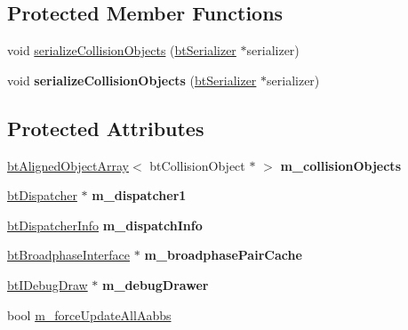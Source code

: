 \subsection*{Protected Member Functions}
\begin{DoxyCompactItemize}
\item 
void \hyperlink{classbtCollisionWorld_aeed5861d66035fa72f40e27b04bdc056}{serialize\+Collision\+Objects} (\hyperlink{classbtSerializer}{bt\+Serializer} $\ast$serializer)
\item 
\mbox{\label{classbtCollisionWorld_aeed5861d66035fa72f40e27b04bdc056}} 
void {\bfseries serialize\+Collision\+Objects} (\hyperlink{classbtSerializer}{bt\+Serializer} $\ast$serializer)
\end{DoxyCompactItemize}
\subsection*{Protected Attributes}
\begin{DoxyCompactItemize}
\item 
\mbox{\label{classbtCollisionWorld_a0e6d877f2834115d9aea1496c42dffba}} 
\hyperlink{classbtAlignedObjectArray}{bt\+Aligned\+Object\+Array}$<$ bt\+Collision\+Object $\ast$ $>$ {\bfseries m\+\_\+collision\+Objects}
\item 
\mbox{\label{classbtCollisionWorld_a1d5b7f3af89efe4ecdb9ac8030e3d351}} 
\hyperlink{classbtDispatcher}{bt\+Dispatcher} $\ast$ {\bfseries m\+\_\+dispatcher1}
\item 
\mbox{\label{classbtCollisionWorld_a07f4c7b327bd773c557a4804bfec7445}} 
\hyperlink{structbtDispatcherInfo}{bt\+Dispatcher\+Info} {\bfseries m\+\_\+dispatch\+Info}
\item 
\mbox{\label{classbtCollisionWorld_a03ca4f13e0ec192c3c474cbd61971c9d}} 
\hyperlink{classbtBroadphaseInterface}{bt\+Broadphase\+Interface} $\ast$ {\bfseries m\+\_\+broadphase\+Pair\+Cache}
\item 
\mbox{\label{classbtCollisionWorld_a56ddae022c90a594e55f1665e7ce624b}} 
\hyperlink{classbtIDebugDraw}{bt\+I\+Debug\+Draw} $\ast$ {\bfseries m\+\_\+debug\+Drawer}
\item 
bool \hyperlink{classbtCollisionWorld_a91b110fc2501b965cdcaa2a6e1d89999}{m\+\_\+force\+Update\+All\+Aabbs}
\end{DoxyCompactItemize}


